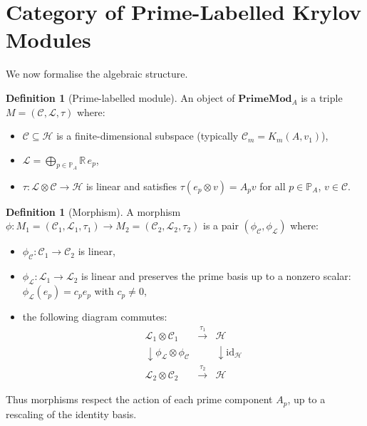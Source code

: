 \documentclass[12pt]{article}
\theoremstyle{plain}
\theoremstyle{definition}
\newtheorem{definition}[theorem]{Definition}
\theoremstyle{remark}
\begin{document}
\section{Category of Prime-Labelled Krylov Modules}\label{sec:category}
We now formalise the algebraic structure.

\begin{definition}[Prime-labelled module]\label{def:mod}
An object of $\mathbf{PrimeMod}_A$ is a triple $M = (\mathcal{C}, \mathcal{L}, \tau)$ where:
\begin{itemize}[nosep]
\item $\mathcal{C}\subseteq\mathcal{H}$ is a finite-dimensional subspace (typically $\mathcal{C}_m = K_m(A,v_1)$),
\item $\mathcal{L} = \bigoplus_{p\in\mathbb{P}_A} \mathbb{R}\, e_p$,
\item $\tau : \mathcal{L}\otimes\mathcal{C} \to \mathcal{H}$ is linear and satisfies $\tau(e_p\otimes v) = A_p v$ for all $p\in\mathbb{P}_A$, $v\in\mathcal{C}$.
\end{itemize}
\end{definition}

\begin{definition}[Morphism]\label{def:morphism}
A morphism $\phi : M_1 = (\mathcal{C}_1,\mathcal{L}_1,\tau_1) \to M_2 = (\mathcal{C}_2,\mathcal{L}_2,\tau_2)$ is a pair $(\phi_{\mathcal{C}}, \phi_{\mathcal{L}})$ where:
\begin{itemize}[nosep]
\item $\phi_{\mathcal{C}} : \mathcal{C}_1 \to \mathcal{C}_2$ is linear,
\item $\phi_{\mathcal{L}} : \mathcal{L}_1 \to \mathcal{L}_2$ is linear and preserves the prime basis up to a nonzero scalar: $\phi_{\mathcal{L}}(e_p) = c_p e_p$ with $c_p\neq 0$,
\item the following diagram commutes:
\[
\begin{array}{ccc}
\mathcal{L}_1\otimes\mathcal{C}_1 & \xrightarrow{\tau_1} & \mathcal{H}\\
\downarrow \scriptstyle{\phi_{\mathcal{L}}\otimes\phi_{\mathcal{C}}} & & \downarrow \scriptstyle{\mathrm{id}_{\mathcal{H}}}\\
\mathcal{L}_2\otimes\mathcal{C}_2 & \xrightarrow{\tau_2} & \mathcal{H}
\end{array}
\]
\end{itemize}
\end{definition}

Thus morphisms respect the action of each prime component $A_p$, up to a rescaling of the identity basis.
\end{document}
